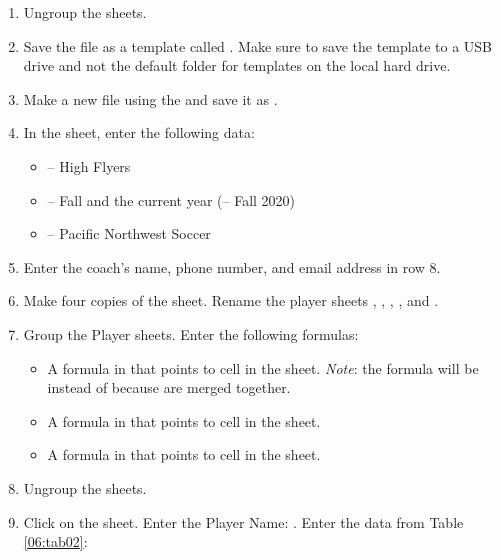 \begin{enumerate}
	\item Ungroup the sheets.
	\item Save the file as a template called . Make sure to save the  template to a USB drive and not the default folder for templates on the local hard drive.
	\item Make a new file using the  and save it as .
	\item In the  sheet, enter the following data:
	
	\begin{itemize}
		\item {} – High Flyers
		\item {} – Fall and the current year (\ie – Fall 2020)
		\item {} – Pacific Northwest Soccer
	\end{itemize}
	
	\item Enter the coach's name, phone number, and email address in row $ 8 $.
	\item Make four copies of the  sheet. Rename the player sheets , , , , and .
	\item Group the Player sheets. Enter the following formulas:

	\begin{itemize}
		\item A formula in  that points to cell  in the  sheet. \textit{Note}: the formula will be  instead of  because  are merged together.
		\item A formula in  that points to cell  in the  sheet.
		\item A formula in  that points to cell  in the  sheet.
	\end{itemize}	

	\item Ungroup the sheets.
	\item Click on the  sheet. Enter the Player Name: . Enter the data from Table \ref{06:tab02}:
\end{enumerate}


